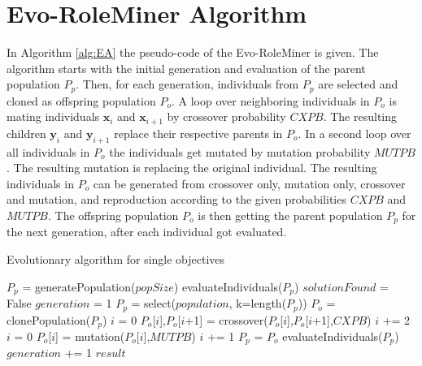 \section{Evo-RoleMiner Algorithm}
	In Algorithm \ref{alg:EA} the pseudo-code of the Evo-RoleMiner is given. The algorithm starts with the initial generation and evaluation of the parent population $P_p$. Then, for each generation, individuals from $P_p$ are selected and cloned as offspring population $P_o$. A loop over neighboring individuals in $P_o$ is mating individuals $\mathbf{x}_i$ and $\mathbf{x}_{i+1}$ by crossover probability $CXPB$. The resulting children $\mathbf{y}_i$ and $\mathbf{y}_{i+1}$ replace their respective parents in $P_o$. In a second loop over all individuals in $P_o$ the individuals get mutated by mutation probability $MUTPB$. The resulting mutation is replacing the original individual. The resulting individuals in $P_o$ can be generated from crossover only, mutation only, crossover and mutation, and reproduction according to the given probabilities $CXPB$ and $MUTPB$. The offspring population $P_o$ is then getting the parent population $P_p$ for the next generation, after each individual got evaluated.
	\begin{algorithm}[H]
	   	\caption{Evolutionary algorithm for single objectives}
	   	\label{alg:EA}
	   	\begin{algorithmic}[1]
	   		\State $P_p$ = generatePopulation($popSize$)
	   		\State evaluateIndividuals($P_p$)
	   		\State $solutionFound$ = False
	   		\State $generation$ = 1
	   		\State $P_p$ = select($population$, k=length($P_p$))
	   		\State $P_o$ = clonePopulation($P_p$)
	   		\State $i$ = 0
	   		\State $P_o$[$i$],$P_o$[$i$+1] = crossover($P_o$[$i$],$P_o$[$i$+1],$CXPB$)
	   		\State $i$ += 2
	   		\EndWhile
	   		\State $i$ = 0
	   		\State $P_o$[$i$] = mutation($P_o$[$i$],$MUTPB$)
	   		\State $i$ += 1
	   		\EndWhile
	   		\State $P_p$ = $P_o$
	   		\State evaluateIndividuals($P_p$)
	   		\State $generation$ += 1
	   		\EndWhile
	   		\State \Return $result$
	   		\EndProcedure
	   	\end{algorithmic}
	\end{algorithm}
	
